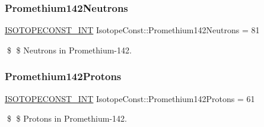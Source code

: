 \subsubsection{\texorpdfstring{Promethium142\+Neutrons}{Promethium142Neutrons}}
{\footnotesize\ttfamily \mbox{\hyperlink{group___isotope_const-_macros_ga5f18360b3e99483a35c32d789e62621c}{I\+S\+O\+T\+O\+P\+E\+C\+O\+N\+S\+T\+\_\+\+I\+NT}} Isotope\+Const\+::\+Promethium142\+Neutrons = 81}

\$ \$ Neutrons in Promethium-\/142. \mbox{\label{group___isotope_const-_promethium-_pm142_ga6d5c70a2085c30cbdf4f6b7274381a3b}} 
\subsubsection{\texorpdfstring{Promethium142\+Protons}{Promethium142Protons}}
{\footnotesize\ttfamily \mbox{\hyperlink{group___isotope_const-_macros_ga5f18360b3e99483a35c32d789e62621c}{I\+S\+O\+T\+O\+P\+E\+C\+O\+N\+S\+T\+\_\+\+I\+NT}} Isotope\+Const\+::\+Promethium142\+Protons = 61}

\$ \$ Protons in Promethium-\/142. 
